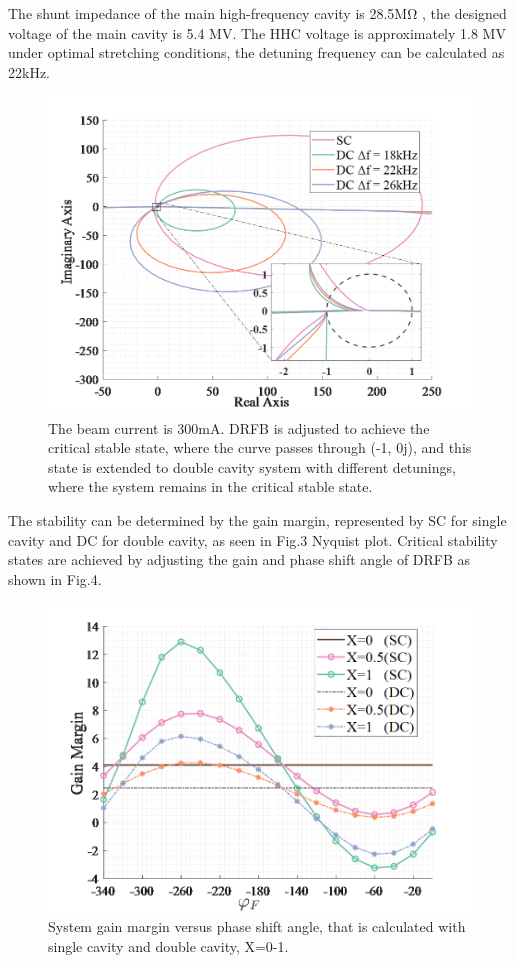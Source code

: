 \documentclass[letterpaper,
               nospread,     %
               ]{jacow}
\begin{document}
The shunt impedance of the main high-frequency cavity is 28.5MΩ , the designed voltage
of the main cavity is 5.4 MV. The HHC voltage is approximately 1.8 MV under optimal
stretching conditions, the detuning frequency can be calculated as 22kHz.
\begin{figure}[!htb]
   \centering
   \includegraphics*[width=0.7\columnwidth]{THPA037_f3}
   \caption{The beam current is 300mA. DRFB is adjusted to achieve the critical
      stable state, where the curve passes through (-1, 0j), and this state is
      extended to double cavity system with different detunings, where the system remains in the critical stable state.}
   \label{fig:paper_layout}
\end{figure}
The stability can be determined by the gain margin, represented by SC for single
cavity and DC for double cavity, as seen in Fig.3 Nyquist plot. Critical stability
states are achieved by adjusting the gain and phase shift angle of DRFB as shown in Fig.4.
\begin{figure}[!htb]
   \centering
   \includegraphics*[width=0.7\columnwidth]{THPA037_f4}
   \caption{System gain margin versus phase shift angle, that is calculated with
      single cavity and double cavity, X=0-1.}
   \label{fig:paper_layout}
\end{figure}
\end{document}
